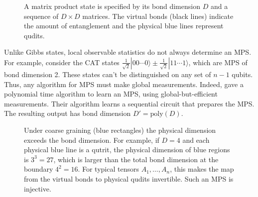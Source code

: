\documentclass[11pt]{article}
\newcommand{\ket}[1]{|#1\rangle}
\begin{document}
\begin{figure}[h]
\centering
{}
\caption{A matrix product state is specified by its bond dimension $D$ and a sequence of $D\times D$ matrices.  The virtual bonds (black lines) indicate the amount of entanglement and the physical blue lines represent qudits.}
\label{fig:MPS}
\end{figure}
Unlike Gibbs states, local observable statistics do not always determine an MPS. For example, consider the CAT states $\frac{1}{\sqrt{2}}\ket{00\cdots 0} \pm \frac{1}{\sqrt{2}}\ket{11\cdots 1}$, which are \textsf{MPS} of bond dimension 2. These states can't be distinguished on any set of $n-1$ qubits. Thus, any algorithm for \textsf{MPS} must make global measurements. Indeed, \cite{LLP10, CPFSGBLPL10} gave a polynomial time algorithm to learn an MPS, using global-but-efficient measurements. Their algorithm learns a sequential circuit that prepares the MPS. The resulting output has bond dimension $D'=\text{poly}(D)$. 

\begin{figure}[h]
\centering
{}
\caption{Under coarse graining (blue rectangles) the physical dimension exceeds the bond dimension. For example, if $D=4$ and each physical blue line is a qutrit, the physical dimension of blue regions is $3^3=27$, which is larger than the total bond dimension at the boundary $4^2=16$. For typical tensors $A_1, \ldots, A_n$, this makes the map from  the virtual bonds to physical qudits invertible. Such an \textsf{MPS} is injective.}
\label{fig:MPSinj}
\end{figure}
\end{document}
